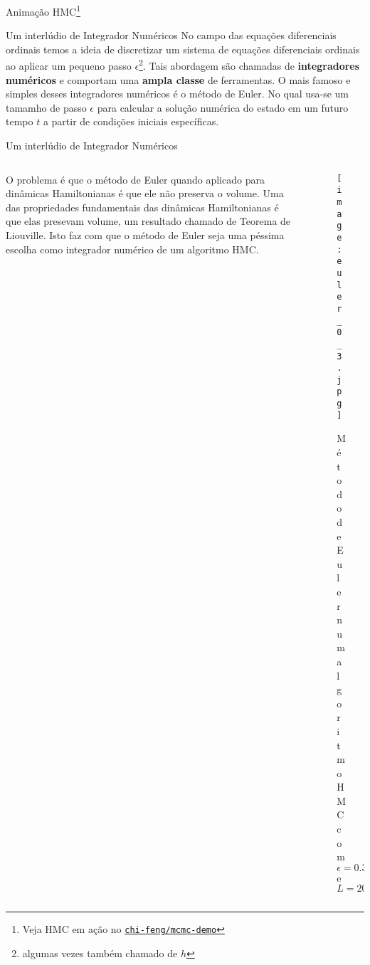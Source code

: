 \begin{frame}{Animação HMC\footnote{Veja HMC em ação no \href{https://chi-feng.github.io/mcmc-demo/app.html?algorithm=HamiltonianHMC&target=banana}{\texttt{chi-feng/mcmc-demo}}}}
\end{frame}

\begin{frame}{Um interlúdio de Integrador Numéricos}
  No campo das equações diferenciais ordinais temos a ideia de discretizar um
  sistema de equações diferenciais ordinais ao aplicar um pequeno passo $\epsilon$\footnote{algumas vezes também chamado de $h$}.
  Tais abordagem são chamadas de \textbf{integradores numéricos} e comportam uma
  \textbf{ampla classe} de ferramentas.
  \vfill
  O mais famoso e simples desses integradores numéricos é o método de Euler. No qual
  usa-se um tamamho de passo $\epsilon$ para calcular a solução numérica do estado
  em um futuro tempo $t$ a partir de condições iniciais específicas.
\end{frame}

\begin{frame}{Um interlúdio de Integrador Numéricos}
  \begin{columns}
    \begin{column}{0.6\textwidth}
      O problema é que o método de Euler quando aplicado para dinâmicas Hamiltonianas
      é que ele não preserva o volume. Uma das propriedades fundamentais das dinâmicas
      Hamiltonianas é que elas presevam volume, um resultado chamado de Teorema de
      Liouville. Isto faz com que o método de Euler seja uma péssima escolha como
      integrador numérico de um algoritmo HMC.
    \end{column}
    \begin{column}{0.4\textwidth}
      \begin{figure}
      \texttt{[image: euler\_0\_3.jpg]}
      \caption{Método de Euler num algoritmo HMC com $\epsilon = 0.3$ e $L = 20$}
      \end{figure}
    \end{column}
  \end{columns}
\end{frame}

